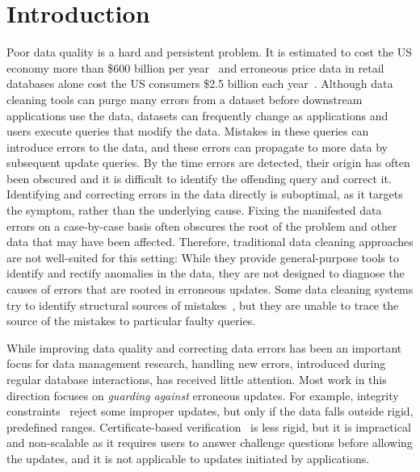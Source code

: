 
\section{Introduction}
\label{s:intro}

Poor data quality is a hard and persistent problem.  
It is estimated to cost the US economy more than \$600 billion
per year~\cite{eckerson2002} and erroneous price data in retail databases
alone cost the US consumers \$2.5 billion each year~\cite{Fan2008}. 
Although data
cleaning tools can purge many errors from a dataset before downstream 
applications use the data, datasets can frequently change as applications
and users execute queries that modify the data.
Mistakes in these queries can introduce errors to the data, and these
errors can propagate to more data by subsequent update queries.
By the time errors are detected, their origin has often been obscured and it is difficult to identify the offending query and correct it.
Identifying and correcting errors in the data directly is suboptimal, as it targets the symptom,
rather than the underlying cause. Fixing the manifested data errors on a
case-by-case basis often obscures the root of the problem and other data that may have been
affected. Therefore, traditional data cleaning approaches are not well-suited
for this setting: While they provide general-purpose tools to identify and
rectify anomalies in the data, they are not designed to diagnose the causes of
errors that are rooted in erroneous updates.
Some data cleaning systems try to identify structural sources of
mistakes~\cite{wang2015}, but they are unable to trace the source of
the mistakes to particular faulty queries.

While improving data quality and correcting data errors has been an important
focus for data management research, handling new errors, introduced during
regular database interactions, has received little attention. Most work in
this direction focuses on \emph{guarding against} erroneous updates. For
example, integrity constraints~\cite{Khoussainova2006} reject some improper
updates, 
but only if the data falls outside rigid, predefined ranges.
Certificate-based verification~\cite{Chen2011} is less rigid, but it is
impractical and non-scalable as it requires users to answer challenge
questions before allowing the updates, and it is not applicable to updates
initiated by applications.

